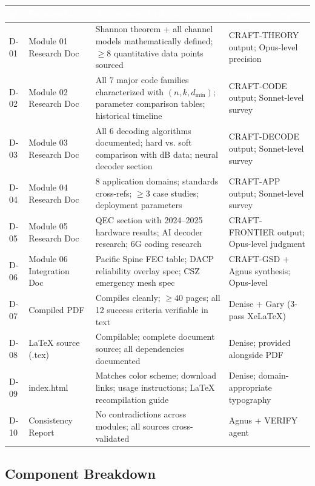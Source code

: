 \documentclass[11pt,letterpaper]{article}
\newcommand{\tableheader}[1]{\textbf{\sffamily\textcolor{white}{#1}}}
\begin{document}
\begin{center}
\begin{tabularx}{\textwidth}{C{0.8cm}L{3cm}L{4cm}X}
\toprule
{}
\tableheader{\#} & \tableheader{Deliverable} & \tableheader{Acceptance Criteria} & \tableheader{Component Spec} \\
\midrule
D-01 & Module 01 Research Doc & Shannon theorem + all channel models mathematically defined; $\geq 8$ quantitative data points sourced & CRAFT-THEORY output; Opus-level precision \\
D-02 & Module 02 Research Doc & All 7 major code families characterized with $(n,k,d_{\min})$; parameter comparison tables; historical timeline & CRAFT-CODE output; Sonnet-level survey \\
D-03 & Module 03 Research Doc & All 6 decoding algorithms documented; hard vs. soft comparison with dB data; neural decoder section & CRAFT-DECODE output; Sonnet-level survey \\
D-04 & Module 04 Research Doc & 8 application domains; standards cross-refs; $\geq 3$ case studies; deployment parameters & CRAFT-APP output; Sonnet-level survey \\
D-05 & Module 05 Research Doc & QEC section with 2024--2025 hardware results; AI decoder research; 6G coding research & CRAFT-FRONTIER output; Opus-level judgment \\
D-06 & Module 06 Integration Doc & Pacific Spine FEC table; DACP reliability overlay spec; CSZ emergency mesh spec & CRAFT-GSD + Agnus synthesis; Opus-level \\
D-07 & Compiled PDF & Compiles cleanly; $\geq 40$ pages; all 12 success criteria verifiable in text & Denise + Gary (3-pass XeLaTeX) \\
D-08 & LaTeX source (.tex) & Compilable; complete document source; all dependencies documented & Denise; provided alongside PDF \\
D-09 & index.html & Matches color scheme; download links; usage instructions; LaTeX recompilation guide & Denise; domain-appropriate typography \\
D-10 & Consistency Report & No contradictions across modules; all sources cross-validated & Agnus + VERIFY agent \\
\bottomrule
\end{tabularx}
\end{center}

\subsection{Component Breakdown}
\end{document}
